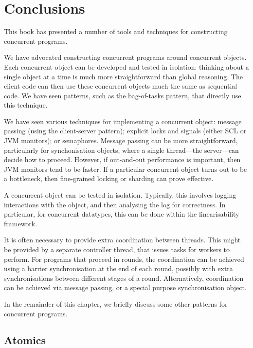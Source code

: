\chapter{Conclusions}



This book has presented a number of tools and techniques for constructing
concurrent programs.  

We have advocated constructing concurrent programs around concurrent objects.
Each concurrent object can be developed and tested in isolation: thinking
about a single object at a time is much more straightforward than global
reasoning.  The client code can then use these concurrent objects much the
same as sequential code.  We have seen patterns, such as the bag-of-tasks
pattern, that directly use this technique.

We have seen various techniques for implementing a concurrent object: message
passing (using the client-server pattern); explicit locks and signals (either
SCL or JVM monitors); or semaphores.  Message passing can be more
straightforward, particularly for synchonisation objects, where a single
thread---the server---can decide how to proceed.  However, if out-and-out
performance is important, then JVM monitors tend to be faster.  If a
particular concurrent object turns out to be a bottleneck, then fine-grained
locking or sharding can prove effective. 

A concurrent object can be tested in isolation.  Typically, this involves
logging interactions with the object, and then analysing the log for
correctness.  In particular, for concurrent datatypes, this can be done within
the linearisability framework. 

It is often necessary to provide extra coordination between threads.  This
might be provided by a separate controller thread, that issues tasks for
workers to perform.  For programs that proceed in rounds, the coordination can
be achieved using a barrier synchronisation at the end of each round, possibly
with extra synchronisations between different stages of a round.
Alternatively, coordination can be achieved via message passing, or a special
purpose synchronisation object.

In the remainder of this chapter, we briefly discuss some other patterns for
concurrent programs. 


\section{Atomics}

